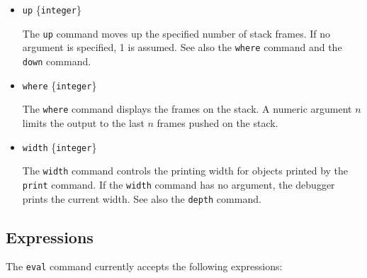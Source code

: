 \begin{itemize}
\item {\tt up} \{{\tt integer}\}

The {\tt up} command moves up the specified number of stack frames.  If no
argument is specified, 1 is assumed.  See also the {\tt where} command and the
{\tt down} command.

\item {\tt where} \{{\tt integer}\}

The {\tt where} command displays the frames on the stack.  A numeric argument
$n$ limits the output to the last $n$ frames pushed on the stack.

\item {\tt width} \{{\tt integer}\}

The {\tt width} command controls the printing width for objects printed by the
{\tt print} command.  If the {\tt width} command has no argument, the debugger
prints the current width.  See also the {\tt depth} command.
\end{itemize}

\subsection{Expressions}

The {\tt eval} command currently accepts the following expressions:

